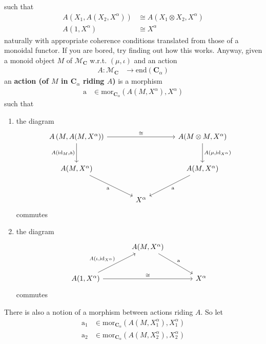 such that
\begin{align*}
  A
  \left(
    X_{1},
    A(X_{2},X^{\alpha})
  \right)
  &\cong
  A
  \left(
    X_{1}
    \otimes
    X_{2},
    X^{\alpha}
  \right)
  \\
  A(1,X^{\alpha})
  &\cong
  X^{\alpha}
\end{align*}
naturally with appropriate coherence conditions translated from those of a monoidal functor.
If you are bored, try finding out how this works.
Anyway, given a monoid object $M$ of $\mathcal{M}_{\mathbf{C}}$ w.r.t. $(\mu,\iota)$ and an action
\begin{align*}
  A
  \colon
  \mathcal{M}_{\mathbf{C}}
  &\rightarrow
  \mathrm{end}(\mathbf{C}_{\alpha})
\end{align*}
an \textbf{action (of $M$ in $\mathbf{C}_{\alpha}$ riding $A$)} is a morphism
\begin{align*}
  \mathrm{a}
  &\in
  \mathrm{mor}_{\mathbf{C}_{\alpha}}
  \left(
    A(M,X^{\alpha}),
    X^{\alpha}
  \right)
\end{align*}
such that
\begin{enumerate}
\item[(ARA1)]
the diagram
\[
\begin{tikzcd}[sep=large]
  A
  \left(
    M,
    A(M,X^{\alpha})
  \right)
  \arrow{rr}{\cong}
  \arrow[swap]{d}{A(\mathrm{id}_{M},\mathrm{a})}
  &
  &
  A(M \otimes M,X^{\alpha})
  \arrow{d}{A(\mu,\mathrm{id}_{X^{\alpha}})}
  \\
  A(M,X^{\alpha})
  \arrow[swap]{dr}{\mathrm{a}}
  &
  &
  A(M,X^{\alpha})
  \arrow{dl}{\mathrm{a}}
  \\
  &
  X^{\alpha}
  &
\end{tikzcd}
\]
commutes
\item[(ARA2)]
the diagram
\[
\begin{tikzcd}[sep=large]
  &
  A(M,X^{\alpha})
  \arrow{dr}{\mathrm{a}}
  &
  \\
  A(1,X^{\alpha})
  \arrow{ur}{A(\iota,\mathrm{id}_{X^{\alpha}})}
  \arrow{rr}{\cong}
  &
  &
  X^{\alpha}
\end{tikzcd}
\]
commutes
\end{enumerate}
There is also a notion of a morphism between actions riding $A$.
So let
\begin{align*}
  \mathrm{a}_{1}
  &\in
  \mathrm{mor}_{\mathbf{C}_{\alpha}}
  \left(
    A(M,X_{1}^{\alpha}),
    X_{1}^{\alpha}
  \right)
  \\
  \mathrm{a}_{2}
  &\in
  \mathrm{mor}_{\mathbf{C}_{\alpha}}
  \left(
    A(M,X_{2}^{\alpha}),
    X_{2}^{\alpha}
  \right)
\end{align*}
